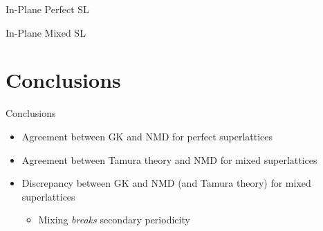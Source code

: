 \documentclass{beamer}
\begin{document}
\begin{frame}{In-Plane Perfect SL}
\begin{figure}[t]
\begin{center}
\vspace*{-0.8cm}
\renewcommand{\figure}{Fig.}
\label{fig:ip}
\end{center}
\end{figure}
\end{frame}

\begin{frame}{In-Plane Mixed SL}
\begin{figure}[t]
\begin{center}
\vspace*{-0.8cm}
\renewcommand{\figure}{Fig.}
\label{fig:ip_all}
\end{center}
\end{figure}
\end{frame}

\section{Conclusions}
\begin{frame}{Conclusions}
\begin{itemize}
\item Agreement between GK and NMD for perfect superlattices
\item Agreement between Tamura theory and NMD for mixed superlattices
\item Discrepancy between GK and NMD (and Tamura theory) for mixed superlattices
\begin{itemize}
\item Mixing \textit{breaks} secondary periodicity
\end{itemize}
\end{itemize}
\end{frame}


\end{document}
